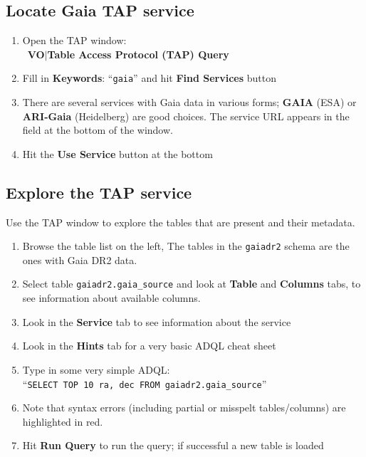 \documentclass{article}
\newcommand{\buttimg}[1]
           {\mbox{\vtop{\vskip-2ex\hbox{\texttt{[image: \#1]}}}}}
\newcommand{\lab}[1]{{\bf #1}}
\newcommand{\mb}[3]{\buttimg{#1}~\lab{#2}$\mid$\lab{#3}}
\newcommand{\entry}[2]{\lab{#1}: ``{\tt #2}''}
\begin{document}
\subsection{Locate Gaia TAP service}

\begin{minipage}[t]{11cm}
  \raggedright

  \begin{enumerate}
  \item Open the TAP window: \\
        \mb{tap_button.png}{VO}{Table Access Protocol (TAP) Query}
  \item Fill in \entry{Keywords}{gaia} and hit \lab{Find Services} button
  \item There are several services with Gaia data in various forms;
        \lab{GAIA} (ESA) or \lab{ARI-Gaia} (Heidelberg) are good choices.
        The service URL appears in the field at the bottom of the window.
  \item Hit the \lab{Use Service} button at the bottom
  \end{enumerate}

  \subsection{Explore the TAP service}

  Use the TAP window to explore the tables that are present and
  their metadata.
  \begin{enumerate}
  \item Browse the table list on the left,
        The tables in the {\tt gaiadr2} schema are the ones with Gaia DR2 data.
  \item Select table {\tt gaiadr2.gaia\_source} and look at
        \lab{Table} and \lab{Columns} tabs,
        to see information about available columns.
  \item Look in the \lab{Service} tab to see information about the service
  \item Look in the \lab{Hints} tab for a very basic ADQL cheat sheet
  \item Type in some very simple ADQL:\\
        ``{\tt SELECT TOP 10 ra, dec FROM gaiadr2.gaia\_source}''
  \item Note that syntax errors (including partial or misspelt tables/columns)
        are highlighted in red.
  \item Hit \lab{Run Query} to run the query;
        if successful a new table is loaded
  \end{enumerate}


\end{minipage}
\end{document}
